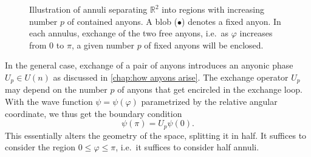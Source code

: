 \begin{figure}[h]
  \centering
  \caption{Illustration of annuli separating $\mathbb{R}^2$ into regions with increasing number $p$ of contained anyons. A blob ($\bullet$) denotes a fixed anyon. In each annulus, exchange of the two free anyons, i.e.\ as $\varphi$ increases from $0$ to $\pi$, a given number $p$ of fixed anyons will be enclosed.}
  \label{fig:annuli}
\end{figure}

In the general case, exchange of a pair of anyons introduces an anyonic phase $U_p \in U(n)$ as discussed in \cref{chap:how anyons arise}. The exchange operator $U_p$ may depend on the number $p$ of anyons that get encircled in the exchange loop. With the wave function $\psi = \psi(\varphi)$ parametrized by the relative angular coordinate, we thus get the boundary condition
\begin{equation}\label{U_p boundary condition}
  \psi(π) = U_p \psi(0).
\end{equation}
This essentially alters the geometry of the space, splitting it in half. It suffices to consider the region $0 \le \varphi \le π$, i.e.\ it suffices to consider half annuli.

